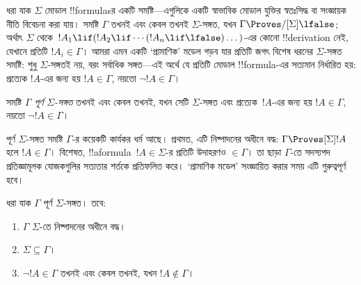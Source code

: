 \documentclass[../../../include/open-logic-section]{subfiles}
\begin{document}


ধরা যাক $\Sigma$ মোডাল !!{formula}sর একটি সমষ্টি—এগুলিকে একটি স্বাভাবিক মোডাল যুক্তির স্বতঃসিদ্ধ বা সংজ্ঞায়ক নীতি বিবেচনা করা যায়। সমষ্টি $\Gamma$ তখনই এবং কেবল তখনই $\Sigma$-সঙ্গত, যখন $\Gamma \Proves/[\Sigma] \lfalse$; অর্থাৎ $\Sigma$ থেকে~$!A_1 \lif (!A_2 \lif \cdots (!A_n \lif \lfalse)\dots)$-এর কোনো !!{derivation} নেই, যেখানে প্রতিটি $!A_i \in \Gamma$। আমরা এমন একটি ‘প্রামাণিক’ মডেল গড়ব যার প্রতিটি জগৎ বিশেষ ধরনের $\Sigma$-সঙ্গত সমষ্টি: শুধু $\Sigma$-সঙ্গতই নয়, বরং সর্বাধিক সঙ্গত—এই অর্থে যে প্রতিটি মোডাল !!{formula}-এর সত্যমান নির্ধারিত হয়: প্রত্যেক $!A$-এর জন্য হয় $!A \in \Gamma$, নয়তো $\lnot !A \in \Gamma$।

\begin{defn}
  সমষ্টি $\Gamma$ \emph{পূর্ণ $\Sigma$-সঙ্গত} তখনই এবং কেবল তখনই, যখন সেটি $\Sigma$-সঙ্গত এবং প্রত্যেক~$!A$-এর জন্য হয় $!A \in \Gamma$, নয়তো $\lnot !A \in \Gamma$।
\end{defn}

পূর্ণ $\Sigma$-সঙ্গত সমষ্টি $\Gamma$-র কয়েকটি কার্যকর ধর্ম আছে। প্রথমত, এটি নিষ্পাদনের অধীনে বদ্ধ: $\Gamma \Proves[\Sigma] !A$ হলে $!A \in \Gamma$। বিশেষত, !!a{formula}~$!A \in \Sigma$-র প্রতিটি উদাহরণও $\in \Gamma$। তা ছাড়া $\Gamma$-তে সদস্যপদ প্রতিজ্ঞামূলক যোজকগুলির সত্যতার শর্তকে প্রতিফলিত করে। ‘প্রামাণিক মডেল’ সংজ্ঞায়িত করার সময় এটি গুরুত্বপূর্ণ হবে।

\begin{prop}
  ধরা যাক $\Gamma$ পূর্ণ $\Sigma$-সঙ্গত। তবে:
  \begin{enumerate}
  \item {}%
    $\Gamma$ $\Sigma$-তে নিষ্পাদনের অধীনে বদ্ধ।
  \item {}%
    $\Sigma \subseteq \Gamma$।
  \item {}%
    $\lnot!A \in \Gamma$ তখনই এবং কেবল তখনই, যখন $!A \notin
    \Gamma$।
  \end{enumerate}
\end{prop}
\end{document}
